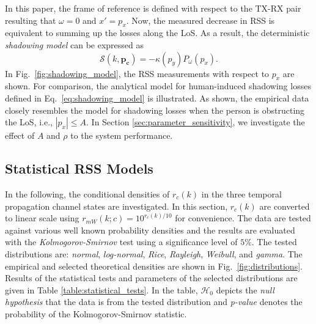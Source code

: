 \documentclass[journal, 10pt, twocolumn, balance]{IEEEtran}
\begin{document}
In this paper, the frame of reference is defined with respect to the TX-RX pair resulting that $\omega = 0$ and $x' = p_x$. Now, the measured decrease in RSS is equivalent to summing up the losses along the LoS. As a result, the deterministic \emph{shadowing model} can be expressed as
\begin{equation}\label{eq:shadowing_model}
	\mathcal{S}(k, \bm{p_c}) = -\kappa(p_y) P_{\omega}(p_x).
\end{equation}
In Fig.~\ref{fig:shadowing_model}, the RSS measurements with respect to $p_x$ are shown. For comparison, the analytical model for human-induced shadowing losses defined in Eq.~\eqref{eq:shadowing_model} is illustrated. As shown, the empirical data closely resembles the model for shadowing losses when the person is obstructing the LoS, i.e., $|p_x| \leq A$. In Section \ref{sec:parameter_sensitivity}, we investigate the effect of $A$ and $\rho$ to the system performance.



\subsection{Statistical RSS Models}\label{S:statistical_models}


In the following, the conditional densities of $r_c(k)$ in the three temporal propagation channel states are investigated. In this section, $r_c(k)$ are converted to linear scale using $r_{mW}(k;c) = 10^{r_c(k)/10}$ for convenience. The data are tested against various well known probability densities and the results are evaluated with the \emph{Kolmogorov-Smirnov} test \cite{massey1969} using a significance level of $5\%$. The tested distributions are: \emph{normal}, \emph{log-normal}, \emph{Rice}, \emph{Rayleigh}, \emph{Weibull}, and \emph{gamma}. The empirical and selected theoretical densities are shown in Fig.~\ref{fig:distributions}. Results of the statistical tests and parameters of the selected distributions are given in Table \ref{table:statistical_tests}. In the table, $\mathcal{H}_0$ depicts the \emph{null hypothesis} that the data is from the tested distribution and \emph{p-value} denotes the probability of the Kolmogorov-Smirnov statistic.
\end{document}
